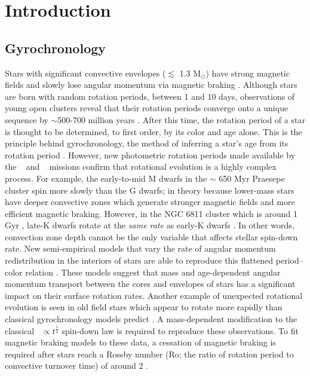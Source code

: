 \section{Introduction}

\subsection{Gyrochronology}

Stars with significant convective envelopes ($\lesssim$ 1.3 M$_\odot$) have
strong magnetic fields and slowly lose angular momentum via magnetic braking
\citep[\eg][]{schatzman1962, weber1967, kraft1967, skumanich1972, kawaler1988,
pinsonneault1989}.
Although stars are born with random rotation periods, between 1 and 10 days,
observations of young open clusters reveal that their rotation periods
converge onto a unique sequence by $\sim$500-700 million years
\citep[\eg][]{irwin2009, gallet2013}.
After this time, the rotation period of a star is thought to be determined, to
first order, by its color and age alone.
This is the principle behind gyrochronology, the method of inferring a
star’s age from its rotation period \citep[\eg][]{barnes2003, barnes2007,
barnes2010, meibom2011, meibom2015}.
However, new photometric rotation periods made available by the \kepler\
\citep{borucki2010} and \ktwo\ \citep{howell2014} missions
\citep[\eg][]{mcquillan2014, garcia2014, douglas2017, rebull2017, meibom2011,
meibom2015, curtis2019} confirm that rotational evolution is a highly complex
process.
For example, the early-to-mid M dwarfs in the $\sim$ 650 Myr Praesepe cluster
spin more slowly than the G dwarfs; in theory because lower-mass stars have
deeper convective zones which generate stronger magnetic fields and more
efficient magnetic braking.
However, in the NGC 6811 cluster which is around 1 Gyr \citep{janes2011,
sandquist2016},
late-K dwarfs rotate at the {\it same rate} as early-K dwarfs
\citep{curtis2019}.
In other words, convection zone depth cannot be the only variable that affects
stellar spin-down rate.
New semi-empirical models that vary the rate of angular momentum
redistribution in the interiors of stars are able to reproduce this flattened
period--color relation \citep{spada2019}.
These models suggest that mass and age-dependent angular momentum transport
between the cores and envelopes of stars has a significant impact on their
surface rotation rates.
Another example of unexpected rotational evolution is seen in old field stars
which appear to rotate more rapidly than classical gyrochronology models
predict \citep{angus2015, vansaders2016, vansaders2018, metcalfe2019}.
A mass-dependent modification to the classical \prot\ $\propto
t^{\frac{1}{2}}$ spin-down law \citep{skumanich1972} is required to reproduce
these observations.
To fit magnetic braking models to these data, a cessation of magnetic braking
is required after stars reach a Rossby number (Ro; the ratio of rotation
period to convective turnover time) of around 2 \citep{vansaders2016,
vansaders2018}.

